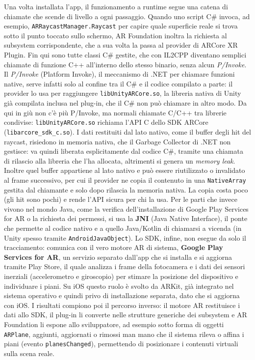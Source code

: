 Una volta installata l'app, il funzionamento a runtime segue una catena di chiamate che scende di livello a ogni passaggio. Quando uno script C\# invoca, ad esempio, \texttt{ARRaycastManager.Raycast} per capire quale superficie reale si trova sotto il punto toccato sullo schermo, AR Foundation inoltra la richiesta al subsystem corrispondente, che a sua volta la passa al provider di ARCore XR Plugin. Fin qui sono tutte classi C\# gestite, che con IL2CPP diventano semplici chiamate di funzione C++ all'interno dello stesso binario, senza alcun \textit{P/Invoke}. Il \textit{P/Invoke} (Platform Invoke), il meccanismo di .NET per chiamare funzioni native, serve infatti solo al confine tra il C\# e il codice compilato a parte: il provider lo usa per raggiungere \texttt{libUnityARCore.so}, la libreria nativa di Unity già compilata inclusa nel plug-in, che il C\# non può chiamare in altro modo. Da qui in giù non c'è più P/Invoke, ma normali chiamate C/C++ tra librerie condivise: \texttt{libUnityARCore.so} richiama l'API C dello SDK ARCore (\texttt{libarcore\_sdk\_c.so}).
 I dati restituiti dal lato nativo, come il buffer degli hit del raycast, risiedono in memoria nativa, che il Garbage Collector di .NET non gestisce: va quindi liberata esplicitamente dal codice C\#, tramite una chiamata di rilascio alla libreria che l'ha allocata, altrimenti si genera un \textit{memory leak}. Inoltre quel buffer appartiene al lato nativo e può essere riutilizzato o invalidato al frame successivo, per cui il provider ne copia il contenuto in una \texttt{NativeArray} gestita dal chiamante e solo dopo rilascia la memoria nativa. La copia costa poco (gli hit sono pochi) e rende l'API sicura per chi la usa.
 Per le parti che invece vivono nel mondo Java, come la verifica dell'installazione di Google Play Services for AR o la richiesta dei permessi, si usa la \textbf{JNI} (Java Native Interface), il ponte che permette al codice nativo e a quello Java/Kotlin di chiamarsi a vicenda (in Unity spesso tramite \texttt{AndroidJavaObject}). Lo SDK, infine, non esegue da solo il tracciamento: comunica con il vero motore AR di sistema, \textbf{Google Play Services for AR}, un servizio separato dall'app che si installa e si aggiorna tramite Play Store, il quale analizza i frame della fotocamera e i dati dei sensori inerziali (accelerometro e giroscopio) per stimare la posizione del dispositivo e individuare i piani. Su iOS questo ruolo è svolto da ARKit, già integrato nel sistema operativo e quindi privo di installazione separata, dato che si aggiorna con iOS. I risultati compiono poi il percorso inverso: il motore AR restituisce i dati allo SDK, il plug-in li converte nelle strutture generiche dei subsystem e AR Foundation li espone allo sviluppatore, ad esempio sotto forma di oggetti \texttt{ARPlane}, aggiunti, aggiornati o rimossi man mano che il sistema rileva o affina i piani (evento \texttt{planesChanged}), permettendo di posizionare i contenuti virtuali sulla scena reale.



